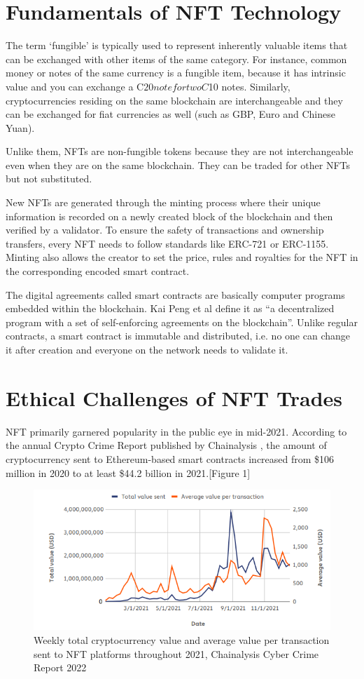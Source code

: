 \documentclass{article}
\begin{document}
\section{Fundamentals of NFT Technology}
The term ‘fungible’ is typically used to represent inherently valuable items that can be exchanged with other items of the same category. For instance, common money or notes of the same currency is a fungible item, because it has intrinsic value and you can exchange a C$20 note for two C$10 notes. Similarly, cryptocurrencies residing on the same blockchain are interchangeable and they can be exchanged for fiat currencies as well (such as GBP, Euro and Chinese Yuan). \cite{UMAR2021121025}

Unlike them, NFTs are non-fungible tokens because they are not interchangeable even when they are on the same blockchain. \cite{Investopedia} They can be traded for other NFTs but not substituted.

New NFTs are generated through the minting process where their unique information is recorded on a newly created block of the blockchain and then verified by a validator. To ensure the safety of transactions and ownership transfers, every NFT needs to follow standards like ERC-721 or ERC-1155. \cite{9803425} Minting also allows the creator to set the price, rules and royalties for the NFT \cite{10.1145/3474355} in the corresponding encoded smart contract.

The digital agreements called smart contracts are basically computer programs embedded within the blockchain. Kai Peng et al \cite{9409120} define it as “a decentralized program with a set of self-enforcing agreements on the blockchain”. Unlike regular contracts, a smart contract is immutable and distributed, i.e. no one can change it after creation and everyone on the network needs to validate it. 

\section{Ethical Challenges of NFT Trades}
NFT primarily garnered popularity in the public eye in mid-2021. According to the annual Crypto Crime Report published by Chainalysis \cite{Chainalysis}, the amount of cryptocurrency sent to Ethereum-based smart contracts increased from \$106 million in 2020 to at least \$44.2 billion in 2021.[Figure 1]

\begin{figure}[ht]
\includegraphics[width=12cm]{fig}
\caption{Weekly total cryptocurrency value and average value per transaction sent to NFT platforms throughout 2021, Chainalysis Cyber Crime Report 2022}
\end{figure}
\end{document}
